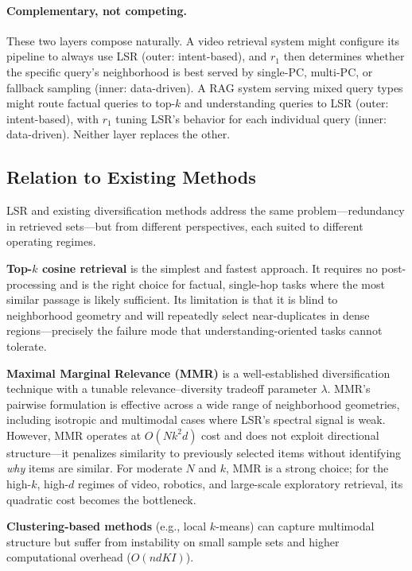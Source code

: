 \documentclass{article}
\begin{document}
\paragraph{Complementary, not competing.}
These two layers compose naturally. A video retrieval system might configure its pipeline to always use LSR (outer: intent-based), and $r_1$ then determines whether the specific query's neighborhood is best served by single-PC, multi-PC, or fallback sampling (inner: data-driven). A RAG system serving mixed query types might route factual queries to top-$k$ and understanding queries to LSR (outer: intent-based), with $r_1$ tuning LSR's behavior for each individual query (inner: data-driven). Neither layer replaces the other.

\subsection{Relation to Existing Methods}

LSR and existing diversification methods address the same problem---redundancy in retrieved sets---but from different perspectives, each suited to different operating regimes.

\textbf{Top-$k$ cosine retrieval} is the simplest and fastest approach. It requires no post-processing and is the right choice for factual, single-hop tasks where the most similar passage is likely sufficient. Its limitation is that it is blind to neighborhood geometry and will repeatedly select near-duplicates in dense regions---precisely the failure mode that understanding-oriented tasks cannot tolerate.

\textbf{Maximal Marginal Relevance (MMR)} \cite{carbonell1998mmr} is a well-established diversification technique with a tunable relevance--diversity tradeoff parameter $\lambda$. MMR's pairwise formulation is effective across a wide range of neighborhood geometries, including isotropic and multimodal cases where LSR's spectral signal is weak. However, MMR operates at $O(Nk^2d)$ cost and does not exploit directional structure---it penalizes similarity to previously selected items without identifying \emph{why} items are similar. For moderate $N$ and $k$, MMR is a strong choice; for the high-$k$, high-$d$ regimes of video, robotics, and large-scale exploratory retrieval, its quadratic cost becomes the bottleneck.

\textbf{Clustering-based methods} (e.g., local $k$-means) can capture multimodal structure but suffer from instability on small sample sets and higher computational overhead ($O(ndKI)$).
\end{document}
